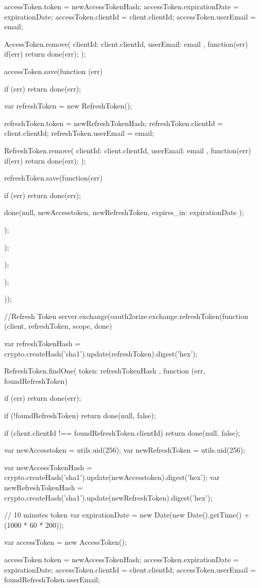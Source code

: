 \begin{flushleft}
{{{			accessToken.token = newAccessTokenHash;
			accessToken.expirationDate = expirationDate;
			accessToken.clientId = client.clientId;
			accessToken.userEmail = email;
			
			AccessToken.remove({ clientId: client.clientId, userEmail: email }, function(err) {
				if(err)
				return done(err);
			});
			
			accessToken.save(function (err) {
				if (err)
				return done(err);
				
				var refreshToken = new RefreshToken();
				
				refreshToken.token = newRefreshTokenHash;
				refreshToken.clientId = client.clientId;
				refreshToken.userEmail = email;
				
				RefreshToken.remove({ clientId: client.clientId, userEmail: email }, function(err) {
					if(err)
					return done(err);
				});
				
				refreshToken.save(function(err) {
					if (err)
					return done(err);
					
					done(null, newAccesstoken, newRefreshToken, { expires\_in: expirationDate });
				});
			});
		});
	});
}));

//Refresh Token
server.exchange(oauth2orize.exchange.refreshToken(function (client, refreshToken, scope, done) {
	var refreshTokenHash = crypto.createHash('sha1').update(refreshToken).digest('hex');
	
	
	RefreshToken.findOne({ token: refreshTokenHash }, function (err, foundRefreshToken) {
		if (err)
		return done(err);
		
		if (!foundRefreshToken)
		return done(null, false);
		
		if (client.clientId !== foundRefreshToken.clientId)
		return done(null, false);
		
		var newAccesstoken = utils.uid(256);
		var newRefreshToken = utils.uid(256);
		
		var newAccessTokenHash = crypto.createHash('sha1').update(newAccesstoken).digest('hex');
		var newRefreshTokenHash = crypto.createHash('sha1').update(newRefreshToken).digest('hex');
		
		// 10 minutes token
		var expirationDate = new Date(new Date().getTime() + (1000 * 60 * 200));
		
		var accessToken = new AccessToken();
		
		accessToken.token = newAccessTokenHash;
		accessToken.expirationDate = expirationDate;
		accessToken.clientId = client.clientId;
		accessToken.userEmail = foundRefreshToken.userEmail;
		
}}
\end{flushleft}
